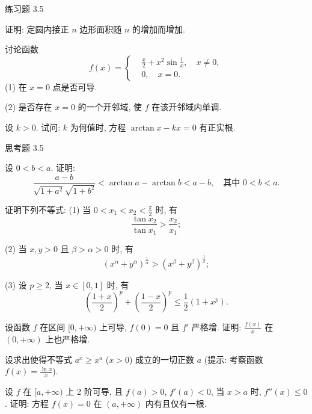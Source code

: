\begin{exblock}{练习题 3.5}
  \item 证明: 定圆内接正 $n$ 边形面积随 $n$ 的增加而增加.

  \item 讨论函数
  \[
  f(x)=\left\{
  \begin{aligned}
  &\frac{x}{2}+x^{2}\sin\frac{1}{x},\quad x\neq 0,\\
  &0,\quad x=0.
  \end{aligned}
  \right.
\]
  (1) 在 $x=0$ 点是否可导.

  (2) 是否存在 $x=0$ 的一个开邻域, 使 $f$ 在该开邻域内单调.

  \item 设 $k>0$. 试问: $k$ 为何值时, 方程 $\arctan x-kx=0$ 有正实根.
\end{exblock}

\begin{exblock}{思考题 3.5}
  \item 设 $0<b<a$. 证明:
  \[
  \frac{a-b}{\sqrt{1+a^{2}}\sqrt{1+b^{2}}}<\arctan a-\arctan b<a-b,\quad\text{其中 } 0<b<a.
\]

  \item 证明下列不等式:
  (1) 当 $0<x_{1}<x_{2}<\frac{\pi}{2}$ 时, 有
  \[
  \frac{\tan x_{2}}{\tan x_{1}}>\frac{x_{2}}{x_{1}};
\]

  (2) 当 $x,y>0$ 且 $\beta>\alpha>0$ 时, 有
  \[
  (x^{\alpha}+y^{\alpha})^{\frac{1}{\alpha}}>(x^{\beta}+y^{\beta})^{\frac{1}{\beta}};
\]

  (3) 设 $p\geqslant 2$, 当 $x\in[0,1]$ 时, 有
  \[
  \left(\frac{1+x}{2}\right)^{p}+\left(\frac{1-x}{2}\right)^{p}\leqslant\frac{1}{2}(1+x^{p}).
\]

  \item 设函数 $f$ 在区间 $[0,+\infty)$ 上可导, $f(0)=0$ 且 $f'$ 严格增. 证明: $\frac{f(x)}{x}$ 在 $(0,+\infty)$ 上也严格增.

  \item 设求出使得不等式 $a^{x}\geqslant x^{a}$ ($x>0$) 成立的一切正数 $a$ (提示: 考察函数 $f(x)=\frac{\ln x}{x}$).

  \item 设 $f$ 在 $[a,+\infty)$ 上 2 阶可导, 且 $f(a)>0$, $f'(a)<0$, 当 $x>a$ 时, $f''(x)\leqslant 0$. 证明: 方程 $f(x)=0$ 在 $(a,+\infty)$ 内有且仅有一根.
\end{exblock}
